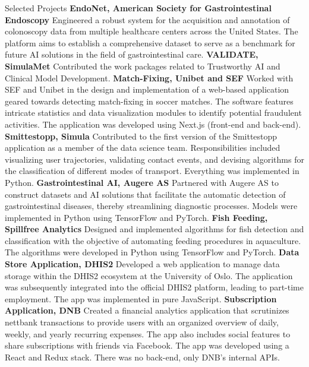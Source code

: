 \begin{rubric}{Selected Projects}
%
\entry*[2023]%
\textbf{EndoNet, American Society for Gastrointestinal Endoscopy} Engineered a robust system for the acquisition and annotation of colonoscopy data from multiple healthcare centers across the United States. The platform aims to establish a comprehensive dataset to serve as a benchmark for future AI solutions in the field of gastrointestinal care.
%
\entry*[2023]%
\textbf{VALIDATE, SimulaMet} Contributed the work packages related to Trustworthy AI and Clinical Model Development.
%
\entry*[2022]%
\textbf{Match-Fixing, Unibet and SEF} Worked with SEF and Unibet in the design and implementation of a web-based application geared towards detecting match-fixing in soccer matches. The software features intricate statistics and data visualization modules to identify potential fraudulent activities. The application was developed using Next.js (front-end and back-end).
%
\entry*[2020]%
\textbf{Smittestopp, Simula} Contributed to the first version of the Smittestopp application as a member of the data science team. Responsibilities included visualizing user trajectories, validating contact events, and devising algorithms for the classification of different modes of transport. Everything was implemented in Python.
%
\entry*[2019]%
\textbf{Gastrointestinal AI, Augere AS} Partnered with Augere AS to construct datasets and AI solutions that facilitate the automatic detection of gastrointestinal diseases, thereby streamlining diagnostic processes. Models were implemented in Python using TensorFlow and PyTorch.
%
\entry*[2018]%
\textbf{Fish Feeding, Spillfree Analytics} Designed and implemented algorithms for fish detection and classification with the objective of automating feeding procedures in aquaculture. The algorithms were developed in Python using TensorFlow and PyTorch.
%
\entry*[2017]%
\textbf{Data Store Application, DHIS2} Developed a web application to manage data storage within the DHIS2 ecosystem at the University of Oslo. The application was subsequently integrated into the official DHIS2 platform, leading to part-time employment. The app was implemented in pure JavaScript.
%
\entry*[2017]%
\textbf{Subscription Application, DNB} Created a financial analytics application that scrutinizes nettbank transactions to provide users with an organized overview of daily, weekly, and yearly recurring expenses. The app also includes social features to share subscriptions with friends via Facebook. The app was developed using a React and Redux stack. There was no back-end, only DNB's internal APIs.
%
\end{rubric}